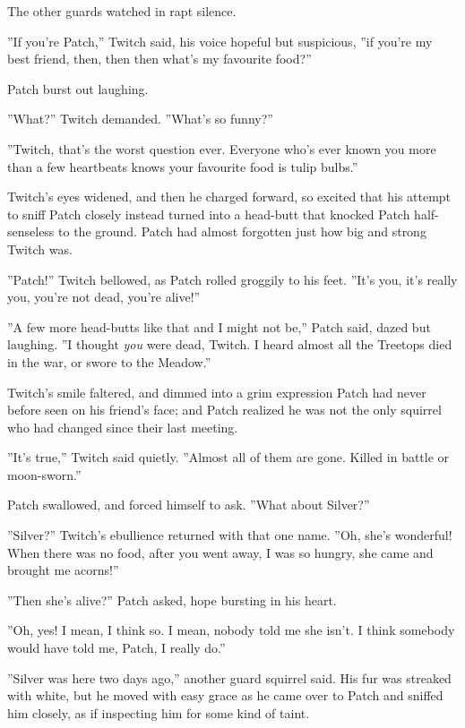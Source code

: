 \documentclass[12pt]{book}
\begin{document}
 The other guards watched in rapt silence.\par
 ''If you're Patch,'' Twitch said, his voice hopeful but suspicious, ''if you're my best friend, then, then %
 then what's my favourite food?''\par
 Patch burst out laughing.\par
 ''What?'' Twitch demanded. ''What's so funny?''\par
 ''Twitch, that's the worst question ever. Everyone who's ever known you more than a few heartbeats knows your favourite food is tulip bulbs.''\par
 Twitch's eyes widened, and then he charged forward, so excited that his attempt to sniff Patch closely instead turned into a head-butt that knocked Patch half-senseless to the ground. Patch had almost forgotten just how big and strong Twitch was.\par
 ''Patch!'' Twitch bellowed, as Patch rolled groggily to his feet. ''It's you, it's really you, you're not dead, you're alive!''\par
 ''A few more head-butts like that and I might not be,'' Patch said, dazed but laughing. ''I thought {\it you} were dead, Twitch. I heard almost all the Treetops died in the war, or swore to the Meadow.''\par
 Twitch's smile faltered, and dimmed into a grim expression Patch had never before seen on his friend's face; and Patch realized he was not the only squirrel who had changed since their last meeting.\par
 ''It's true,'' Twitch said quietly. ''Almost all of them are gone. Killed in battle or moon-sworn.''\par
 Patch swallowed, and forced himself to ask. ''What about Silver?''\par
 ''Silver?'' Twitch's ebullience returned with that one name. ''Oh, she's wonderful! When there was no food, after you went away, I was so hungry, she came and brought me acorns!''\par
 ''Then she's alive?'' Patch asked, hope bursting in his heart.\par
 ''Oh, yes! I mean, I think so. I mean, nobody told me she isn't. I think somebody would have told me, Patch, I really do.''\par
 ''Silver was here two days ago,'' another guard squirrel said. His fur was streaked with white, but he moved with easy grace as he came over to Patch and sniffed him closely, as if inspecting him for some kind of taint.\par
\end{document}
